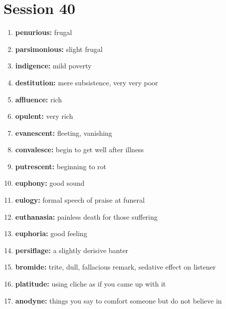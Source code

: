 \documentclass{article}
\begin{document}
\section{Session 40}
\begin{enumerate}
    \item \textbf{penurious: }{frugal}
    \item \textbf{parsimonious: }{slight frugal}
    \item \textbf{indigence: }{mild poverty}
    \item \textbf{destitution: }{mere subsistence, very very poor}
    \item \textbf{affluence: }{rich}
    \item \textbf{opulent: }{very rich}
    \item \textbf{evanescent: }{fleeting, vanishing}
    \item \textbf{convalesce: }{begin to get well after illness}
    \item \textbf{putrescent: }{beginning to rot}
    \item \textbf{euphony: }{good sound}
    \item \textbf{eulogy: }{formal speech of praise at funeral}
    \item \textbf{euthanasia: }{painless death for those suffering}
    \item \textbf{euphoria: }{good feeling}
    \item \textbf{persiflage: }{a slightly derisive banter}
    \item \textbf{bromide: }{trite, dull, fallacious remark, sedative effect on listener}
    \item \textbf{platitude: }{using cliche as if you came up with it}
    \item \textbf{anodyne: }{things you say to comfort someone but do not believe in}
    
\end{enumerate}
\end{document}
